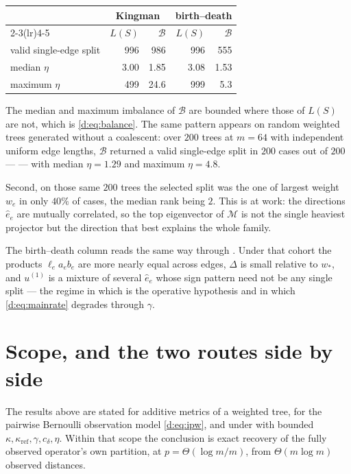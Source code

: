 \documentclass[11pt]{article}
\theoremstyle{plain}
\theoremstyle{definition}
\theoremstyle{remark}
\providecommand{\Bop}{\mathcal{B}}           %
\providecommand{\Mop}{\mathcal{M}}           %
\providecommand{\uone}{u^{(1)}}
\providecommand{\1}{\mathbf{1}}
\newcommand{\wst}{w_{*}}
\newcommand{\ehat}{\hat{e}}
\begin{document}
\begin{center}
\begin{tabular}{lrrrr}
\toprule
 & \multicolumn{2}{c}{Kingman} & \multicolumn{2}{c}{birth--death}\\
\cmidrule(lr){2-3}\cmidrule(lr){4-5}
 & $L(S)$ & $\Bop$ & $L(S)$ & $\Bop$\\
\midrule
valid single-edge split & 996 & 986 & 996 & 555\\
median $\eta$           & 3.00 & 1.85 & 3.08 & 1.53\\
maximum $\eta$          & 499 & 24.6 & 999 & 5.3\\
\bottomrule
\end{tabular}
\end{center}

\noindent
The median and maximum imbalance of $\Bop$ are bounded where those of $L(S)$ are
not, which is \eqref{d:eq:balance}. The same pattern appears on random weighted
trees generated without a coalescent: over $200$ trees at $m=64$ with
independent uniform edge lengths, $\Bop$ returned a valid single-edge split in
$200$ cases out of $200$ ---  --- with median $\eta=1.29$
and maximum $\eta=4.8$.

Second, on those same $200$ trees the selected split was the one of largest
weight $w_e$ in only $40\%$ of cases, the median rank being $2$. This is
 at work: the directions $\ehat_e$ are mutually correlated, so
the top eigenvector of $\Mop$ is not the single heaviest projector but the
direction that best explains the whole family.

The birth--death column reads the same way through . Under that
cohort the products $\ell_ea_eb_e$ are more nearly equal across edges, $\Delta$
is small relative to $\wst$, and $\uone$ is a mixture of several $\ehat_e$ whose
sign pattern need not be any single split --- the regime in which
 is the operative hypothesis and in which
\eqref{d:eq:mainrate} degrades through $\gamma$.

\section{Scope, and the two routes side by side}\label{d:sec:scope}

The results above are stated for additive metrics of a weighted tree, for the
pairwise Bernoulli observation model \eqref{d:eq:ipw}, and under
 with bounded
$\kappa,\kappa_{\mathrm{ref}},\gamma,c_\delta,\eta$. Within that scope the
conclusion is exact recovery of the fully observed operator's own partition, at
$p=\Theta(\log m/m)$, from $\Theta(m\log m)$ observed distances.
\end{document}
